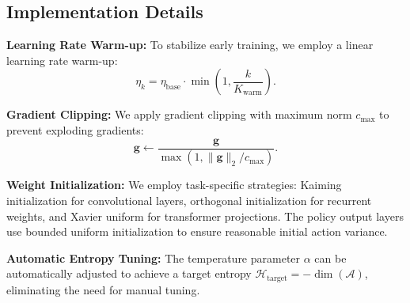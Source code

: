 \subsection{Implementation Details}

\textbf{Learning Rate Warm-up:} To stabilize early training, we employ a linear learning rate warm-up:
\begin{equation}
\eta_k = \eta_{\text{base}} \cdot \min\left(1, \frac{k}{K_{\text{warm}}}\right).
\end{equation}

\textbf{Gradient Clipping:} We apply gradient clipping with maximum norm $c_{\text{max}}$ to prevent exploding gradients:
\begin{equation}
\mathbf{g} \leftarrow \frac{\mathbf{g}}{\max(1, \|\mathbf{g}\|_2 / c_{\text{max}})}.
\end{equation}

\textbf{Weight Initialization:} We employ task-specific strategies: Kaiming initialization for convolutional layers, orthogonal initialization for recurrent weights, and Xavier uniform for transformer projections. The policy output layers use bounded uniform initialization to ensure reasonable initial action variance.

\textbf{Automatic Entropy Tuning:} The temperature parameter $\alpha$ can be automatically adjusted to achieve a target entropy $\mathcal{H}_{\text{target}} = -\dim(\mathcal{A})$, eliminating the need for manual tuning.
